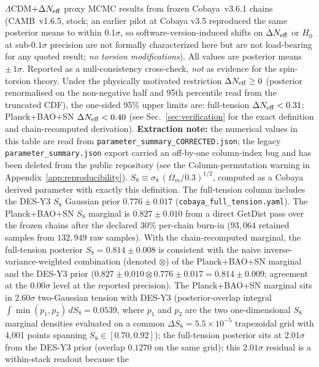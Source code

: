 \documentclass[aps,prd,twocolumn,superscriptaddress,showpacs,preprintnumbers,nofootinbib,longbibliography,floatfix]{revtex4-2}
\newcommand{\Neff}{N_{\rm eff}}
\begin{document}
\begin{table}[t]
\caption{\label{tab:verification} $\Lambda$CDM$+\Delta\Neff$ proxy MCMC results
from frozen Cobaya~v3.6.1 chains (CAMB~v1.6.5, stock; an earlier pilot at
Cobaya v3.5 reproduced the same posterior means to within $0.1\sigma$, so
software-version-induced shifts on $\Delta\Neff$ or $H_0$ at sub-$0.1\sigma$
precision are not formally characterized here but are not load-bearing for
any quoted result; \emph{no torsion
modifications}). All values are posterior means $\pm\,1\sigma$. Reported as a
null-consistency cross-check, \emph{not} as evidence for the spin-torsion theory.
Under the physically motivated restriction $\Delta\Neff\ge 0$ (posterior renormalised
on the non-negative half and 95th percentile read from the truncated CDF), the one-sided
95\% upper limits are: full-tension $\Delta\Neff < 0.31$; Planck+BAO+SN $\Delta\Neff < 0.40$
(see Sec.~\ref{sec:verification} for the exact definition and chain-recomputed derivation).
\textbf{Extraction note:} the numerical values in this table are read from
\texttt{parameter\_summary\_CORRECTED.json}; the legacy
\texttt{parameter\_summary.json} export carried an off-by-one column-index
bug and has been deleted from the public repository (see the
Column-permutation warning in Appendix~\ref{app:reproducibility}).
$S_8 \equiv \sigma_8\,(\Omega_m/0.3)^{1/2}$, computed as a Cobaya derived
parameter with exactly this definition. The full-tension column includes
the DES-Y3 $S_8$ Gaussian prior $0.776 \pm 0.017$
(\texttt{cobaya\_full\_tension.yaml}).
The Planck+BAO+SN $S_8$ marginal is $0.827\pm 0.010$ from a direct GetDist
pass over the frozen chains after the declared 30\% per-chain burn-in
($93{,}064$ retained samples from $132{,}949$ raw samples). With the
chain-recomputed marginal, the full-tension posterior
$S_8 = 0.814\pm 0.008$ is consistent with the naive inverse-variance-weighted
combination (denoted $\otimes$) of the Planck+BAO+SN marginal and the DES-Y3 prior
($0.827\pm 0.010 \otimes 0.776\pm 0.017 = 0.814\pm 0.009$; agreement at
the $0.00\sigma$ level at the reported precision). The Planck+BAO+SN marginal sits in $2.60\sigma$
two-Gaussian tension with DES-Y3 (posterior-overlap integral
$\int\!\min(p_1,p_2)\,dS_8 = 0.0539$, where $p_1$ and $p_2$ are the two
one-dimensional $S_8$ marginal densities evaluated on a common
$\Delta S_8 = 5.5\times10^{-5}$ trapezoidal grid with 4{,}001 points spanning
$S_8 \in [0.70, 0.92]$); the full-tension posterior sits at
$2.01\sigma$ from the DES-Y3 prior (overlap $0.1270$ on the same grid);
this $2.01\sigma$ residual is a within-stack readout because the
}
\end{table}
\end{document}
